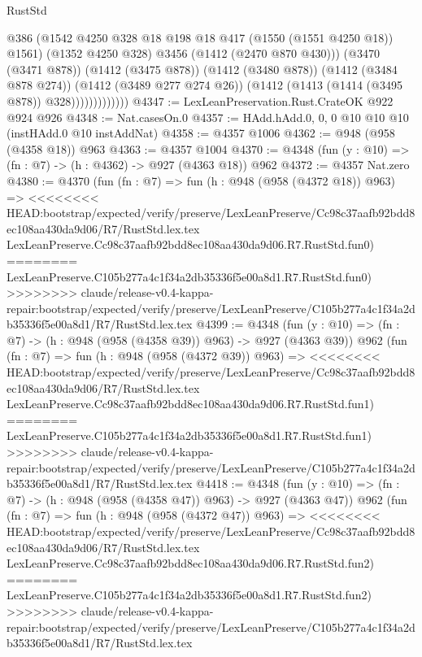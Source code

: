 \begin{lexlean}{RustStd}
\begin{coremodule}
{\begin{coremodule}
{{{{{{{{{{                            @386
                            (@1542 @4250 @328 @18 @198 @18 @417 (@1550 (@1551 @4250 @18)) @1561)
                            (@1352 @4250 @328)
                            @3456
                            (@1412 (@2470 @870 @430)))
                          (@3470 (@3471 @878))
                          (@1412 (@3475 @878))
                          (@1412 (@3480 @878))
                          (@1412 (@3484 @878 @274))
                          (@1412 (@3489 @277 @274 @26))
                          (@1412 (@1413 (@1414 (@3495 @878)) @328)))))))))))))
@4347 := LexLeanPreservation.Rust.CrateOK @922 @924 @926
@4348 := Nat.casesOn.{0}
@4357 := HAdd.hAdd.{0, 0, 0} @10 @10 @10 (instHAdd.{0} @10 instAddNat)
@4358 := @4357 @1006
@4362 := @948 (@958 (@4358 @18)) @963
@4363 := @4357 @1004
@4370 := @4348 (fun (y : @10) => (fn : @7) -> (h : @4362) -> @927 (@4363 @18)) @962
@4372 := @4357 Nat.zero
@4380 := @4370
    (fun (fn : @7) =>
    fun (h : @948 (@958 (@4372 @18)) @963) =>
<<<<<<<< HEAD:bootstrap/expected/verify/preserve/LexLeanPreserve/Cc98c37aafb92bdd8ec108aa430da9d06/R7/RustStd.lex.tex
    LexLeanPreserve.Cc98c37aafb92bdd8ec108aa430da9d06.R7.RustStd.fun0)
========
    LexLeanPreserve.C105b277a4c1f34a2db35336f5e00a8d1.R7.RustStd.fun0)
>>>>>>>> claude/release-v0.4-kappa-repair:bootstrap/expected/verify/preserve/LexLeanPreserve/C105b277a4c1f34a2db35336f5e00a8d1/R7/RustStd.lex.tex
@4399 := @4348
    (fun (y : @10) => (fn : @7) -> (h : @948 (@958 (@4358 @39)) @963) -> @927 (@4363 @39))
    @962
    (fun (fn : @7) =>
    fun (h : @948 (@958 (@4372 @39)) @963) =>
<<<<<<<< HEAD:bootstrap/expected/verify/preserve/LexLeanPreserve/Cc98c37aafb92bdd8ec108aa430da9d06/R7/RustStd.lex.tex
    LexLeanPreserve.Cc98c37aafb92bdd8ec108aa430da9d06.R7.RustStd.fun1)
========
    LexLeanPreserve.C105b277a4c1f34a2db35336f5e00a8d1.R7.RustStd.fun1)
>>>>>>>> claude/release-v0.4-kappa-repair:bootstrap/expected/verify/preserve/LexLeanPreserve/C105b277a4c1f34a2db35336f5e00a8d1/R7/RustStd.lex.tex
@4418 := @4348
    (fun (y : @10) => (fn : @7) -> (h : @948 (@958 (@4358 @47)) @963) -> @927 (@4363 @47))
    @962
    (fun (fn : @7) =>
    fun (h : @948 (@958 (@4372 @47)) @963) =>
<<<<<<<< HEAD:bootstrap/expected/verify/preserve/LexLeanPreserve/Cc98c37aafb92bdd8ec108aa430da9d06/R7/RustStd.lex.tex
    LexLeanPreserve.Cc98c37aafb92bdd8ec108aa430da9d06.R7.RustStd.fun2)
========
    LexLeanPreserve.C105b277a4c1f34a2db35336f5e00a8d1.R7.RustStd.fun2)
>>>>>>>> claude/release-v0.4-kappa-repair:bootstrap/expected/verify/preserve/LexLeanPreserve/C105b277a4c1f34a2db35336f5e00a8d1/R7/RustStd.lex.tex
}}}}}}}}}}
\end{coremodule}}
\end{coremodule}
\end{lexlean}
